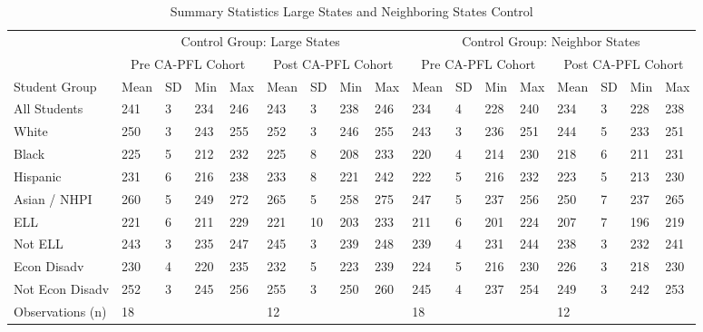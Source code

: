 \begin{table}[!h]
\centering
\caption{Summary Statistics Large States and Neighboring States Control}
\centering
\begin{tabular}[t]{lllllllllllllllll}
\toprule
\multicolumn{1}{c}{ } & \multicolumn{8}{c}{Control Group: Large States} & \multicolumn{8}{c}{Control Group: Neighbor States} \\
\cmidrule(l{3pt}r{3pt}){2-9} \cmidrule(l{3pt}r{3pt}){10-17}
\multicolumn{1}{c}{ } & \multicolumn{4}{c}{Pre CA-PFL Cohort} & \multicolumn{4}{c}{Post CA-PFL Cohort} & \multicolumn{4}{c}{Pre CA-PFL Cohort} & \multicolumn{4}{c}{Post CA-PFL Cohort} \\
\cmidrule(l{3pt}r{3pt}){2-5} \cmidrule(l{3pt}r{3pt}){6-9} \cmidrule(l{3pt}r{3pt}){10-13} \cmidrule(l{3pt}r{3pt}){14-17}
Student Group & Mean & SD & Min & Max & Mean & SD & Min & Max & Mean & SD & Min & Max & Mean & SD & Min & Max\\
\midrule
All Students & 241 & 3 & 234 & 246 & 243 & 3 & 238 & 246 & 234 & 4 & 228 & 240 & 234 & 3 & 228 & 238\\
White & 250 & 3 & 243 & 255 & 252 & 3 & 246 & 255 & 243 & 3 & 236 & 251 & 244 & 5 & 233 & 251\\
Black & 225 & 5 & 212 & 232 & 225 & 8 & 208 & 233 & 220 & 4 & 214 & 230 & 218 & 6 & 211 & 231\\
Hispanic & 231 & 6 & 216 & 238 & 233 & 8 & 221 & 242 & 222 & 5 & 216 & 232 & 223 & 5 & 213 & 230\\
Asian / NHPI & 260 & 5 & 249 & 272 & 265 & 5 & 258 & 275 & 247 & 5 & 237 & 256 & 250 & 7 & 237 & 265\\
\addlinespace
ELL & 221 & 6 & 211 & 229 & 221 & 10 & 203 & 233 & 211 & 6 & 201 & 224 & 207 & 7 & 196 & 219\\
Not ELL & 243 & 3 & 235 & 247 & 245 & 3 & 239 & 248 & 239 & 4 & 231 & 244 & 238 & 3 & 232 & 241\\
Econ Disadv & 230 & 4 & 220 & 235 & 232 & 5 & 223 & 239 & 224 & 5 & 216 & 230 & 226 & 3 & 218 & 230\\
Not Econ Disadv & 252 & 3 & 245 & 256 & 255 & 3 & 250 & 260 & 245 & 4 & 237 & 254 & 249 & 3 & 242 & 253\\
Observations (n) & 18 &  &  &  & 12 &  &  &  & 18 &  &  &  & 12 &  &  & \\
\bottomrule
\end{tabular}
\end{table}
